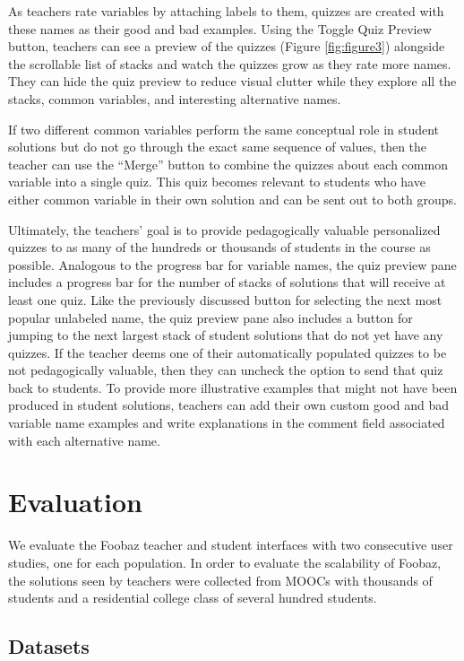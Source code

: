 {{As teachers rate variables by attaching labels to them, quizzes are created with these names as their good and bad examples. Using the Toggle Quiz Preview button, teachers can see a preview of the quizzes (Figure \ref{fig:figure3}) alongside the scrollable list of stacks and watch the quizzes grow as they rate more names. They can hide the quiz preview to reduce visual clutter while they explore all the stacks, common variables, and interesting alternative names.

If two different common variables perform the same conceptual role in student solutions but do not go through the exact same sequence of values, then the teacher can use the ``Merge'' button to combine the quizzes about each common variable into a single quiz. This quiz becomes relevant to students who have either common variable in their own solution and can be sent out to both groups.

Ultimately, the teachers' goal is to provide pedagogically valuable personalized quizzes to as many of the hundreds or thousands of students in the course as possible. Analogous to the progress bar for variable names, the quiz preview pane includes a progress bar for the number of stacks of solutions that will receive at least one quiz. Like the previously discussed button for selecting the next most popular unlabeled name, the quiz preview pane also includes a button for jumping to the next largest stack of student solutions that do not yet have any quizzes. If the teacher deems one of their automatically populated quizzes to be not pedagogically valuable, then they can uncheck the option to send that quiz back to students. To provide more illustrative examples that might not have been produced in student solutions, teachers can add their own custom good and bad variable name examples and write explanations in the comment field associated with each alternative name.

\section{Evaluation}

We evaluate the Foobaz teacher and student interfaces with two consecutive user studies, one for each population. In order to evaluate the scalability of Foobaz, the solutions seen by teachers were collected from MOOCs with thousands of students and a residential college class of several hundred students.

\subsection{Datasets}

}}
